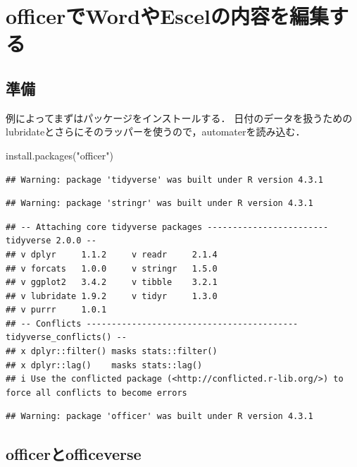 \documentclass[
]{article}
\newenvironment{Shaded}{\begin{snugshade}}{\end{snugshade}}
\newcommand{\FunctionTok}[1]{\textcolor[rgb]{0.00,0.00,0.00}{#1}}
\newcommand{\NormalTok}[1]{#1}
\newcommand{\StringTok}[1]{\textcolor[rgb]{0.31,0.60,0.02}{#1}}
\begin{document}
\hypertarget{officer}{%
\section{officerでWordやEscelの内容を編集する}\label{officer}}

\hypertarget{ux6e96ux5099-17}{%
\subsection{準備}\label{ux6e96ux5099-17}}

例によってまずはパッケージをインストールする．
日付のデータを扱うためのlubridateとさらにそのラッパーを使うので，automaterを読み込む．

\begin{Shaded}
\begin{Highlighting}[]
\FunctionTok{install.packages}\NormalTok{(}\StringTok{"officer"}\NormalTok{)}
\end{Highlighting}
\end{Shaded}

\begin{verbatim}
## Warning: package 'tidyverse' was built under R version 4.3.1
\end{verbatim}

\begin{verbatim}
## Warning: package 'stringr' was built under R version 4.3.1
\end{verbatim}

\begin{verbatim}
## -- Attaching core tidyverse packages ------------------------ tidyverse 2.0.0 --
## v dplyr     1.1.2     v readr     2.1.4
## v forcats   1.0.0     v stringr   1.5.0
## v ggplot2   3.4.2     v tibble    3.2.1
## v lubridate 1.9.2     v tidyr     1.3.0
## v purrr     1.0.1     
## -- Conflicts ------------------------------------------ tidyverse_conflicts() --
## x dplyr::filter() masks stats::filter()
## x dplyr::lag()    masks stats::lag()
## i Use the conflicted package (<http://conflicted.r-lib.org/>) to force all conflicts to become errors
\end{verbatim}

\begin{verbatim}
## Warning: package 'officer' was built under R version 4.3.1
\end{verbatim}

\hypertarget{officerux3068officeverse}{%
\subsection{officerとofficeverse}\label{officerux3068officeverse}}
\end{document}
